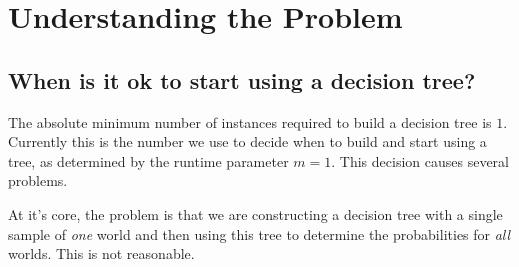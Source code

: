 \documentclass[a4paper]{article}
\newcommand{\dt}{{decision tree}\xspace}
\begin{document}
\section{Understanding the Problem}
\label{sec:understanding}

\subsection{When is it ok to start using a \dt?}
\label{subsec:useDT}

The absolute minimum number of instances required to build a \dt is $1$. Currently this is the number we use to decide when to build and start using a tree, as determined by the  runtime parameter $m=1$. This decision causes several problems. 

At it's core, the problem is that we are constructing a \dt with a single sample of \emph{one} world and then using this tree to determine the probabilities for \emph{all} worlds. This is not reasonable. 
\end{document}
